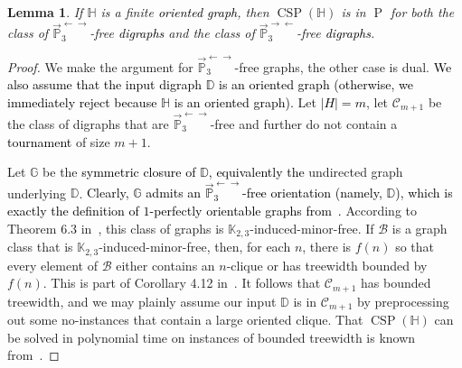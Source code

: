 \documentclass{article}
\newtheorem{lemma}[theorem]{Lemma}
\theoremstyle{definition}
\theoremstyle{remark}
\newcommand{\blue}[1]{\textcolor{black}{#1}}
\DeclareMathOperator{\cP}{P}
\DeclareMathOperator{\CSP}{CSP}
\newcommand{\bD}{{\mathbb D}}
\newcommand{\bG}{{\mathbb G}}
\newcommand{\bH}{{\mathbb H}}
\newcommand{\bK}{{\mathbb K}}
\newcommand{\bP}{{\mathbb P}}
\newcommand{\calC}{{\mathcal C}}
\begin{document}
\begin{lemma}
    If $\bH$ is a finite \blue{oriented graph}, then  $\CSP(\bH)$ is in $\cP$ for both the class of $\vec{\bP}_3^{\leftarrow\rightarrow}$-free \blue{digraphs} and the class of
    $\vec{\bP}_3^{\rightarrow\leftarrow}$-free \blue{digraphs}.
    \label{lem:martin-milanic}
\end{lemma}
\begin{proof}
    We make the argument for $\vec{\bP}_3^{\leftarrow\rightarrow}$-free graphs, the other case is dual. 
    \blue{We also assume that the input digraph $\bD$ is an oriented graph (otherwise, we immediately
    reject because $\bH$ is an oriented graph).} Let \blue{$|H|=m$},
    let $\calC_{m+1}$ be the class of digraphs that are $\vec{\bP}_3^{\leftarrow\rightarrow}$-free and further do not contain
    a \blue{tournament} of size $m+1$.
    
    Let $\bG$ be the \blue{symmetric closure of $\bD$, equivalently the} undirected graph underlying $\bD$.
    \blue{Clearly, $\bG$ admits an $\vec{\bP}_3^{\leftarrow\rightarrow}$-free orientation (namely, $\bD$),
    which is exactly the definition of $1$-perfectly orientable graphs from~\cite{HM17}.} According to
    Theorem 6.3 in~\cite{HM17}, this class of graphs is $\bK_{2,3}$-induced-minor-free. If $\mathcal B$ is a graph class
    that is $\bK_{2,3}$-induced-minor-free, then, for each $n$, there is $f(n)$ so that every element of $\mathcal B$
    either contains an $n$-clique or has treewidth bounded by $f(n)$. This is part of Corollary 4.12 in~\cite{DMS21}.
    It follows that $\calC_{m+1}$ has bounded treewidth, and we may plainly assume our input $\bD$ is in $\calC_{m+1}$
    by preprocessing out some no-instances that contain a large oriented clique.
    That $\CSP(\bH)$ can be solved in polynomial time on instances of bounded treewidth is known from~\cite{Dechter}.
\end{proof}
\end{document}
